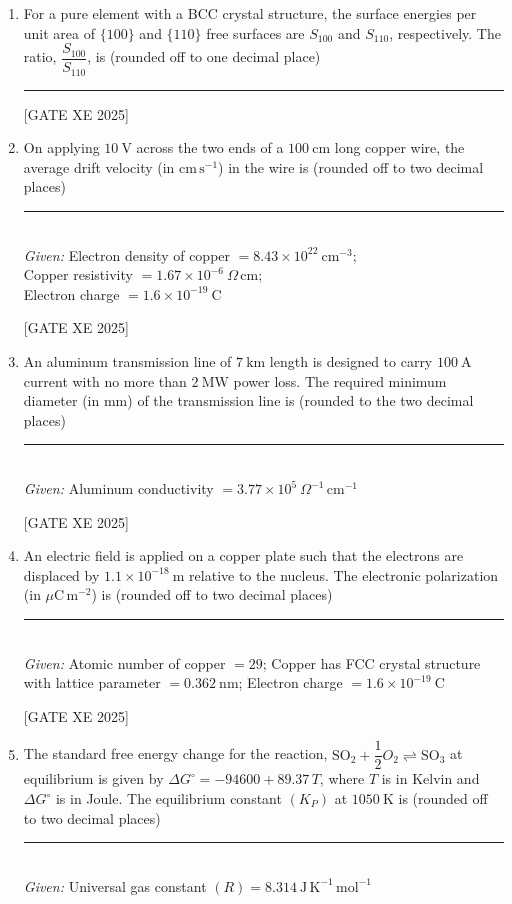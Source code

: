 \documentclass[journal,12pt,onecolumn]{IEEEtran}
\theoremstyle{remark}
\begin{document}
\begin{enumerate}
\item For a pure element with a BCC crystal structure, the surface energies per unit area of $\{100\}$ and $\{110\}$ free surfaces are $S_{100}$ and $S_{110}$, respectively. The ratio, $\dfrac{S_{100}}{S_{110}}$, is (rounded off to one decimal place) \rule{3cm}{0.15mm}

\hfill[GATE XE 2025]

\item On applying $10~\mathrm{V}$ across the two ends of a $100~\mathrm{cm}$ long copper wire, the average drift velocity (in $\mathrm{cm\, s^{-1}}$) in the wire is (rounded off to two decimal places) \rule{3cm}{0.15mm} \\
\textit{Given:} Electron density of copper $= 8.43 \times 10^{22}~\mathrm{cm^{-3}}$; \\
Copper resistivity $= 1.67 \times 10^{-6}~\Omega\,\mathrm{cm}$; \\
Electron charge $= 1.6 \times 10^{-19}~\mathrm{C}$

\hfill[GATE XE 2025]

\item An aluminum transmission line of $7~\mathrm{km}$ length is designed to carry $100~\mathrm{A}$ current with no more than $2~\mathrm{MW}$ power loss. The required minimum diameter (in mm) of the transmission line is (rounded to the two decimal places) \rule{3cm}{0.15mm} \\
\textit{Given:} Aluminum conductivity $= 3.77 \times 10^{5}~\Omega^{-1}\,\mathrm{cm^{-1}}$

\hfill[GATE XE 2025]

\item An electric field is applied on a copper plate such that the electrons are displaced by $1.1 \times 10^{-18}~\mathrm{m}$ relative to the nucleus. The electronic polarization (in $\mu\mathrm{C\, m^{-2}}$) is (rounded off to two decimal places) \rule{3cm}{0.15mm} \\
\textit{Given:} Atomic number of copper $=29$; Copper has FCC crystal structure with lattice parameter $= 0.362~\mathrm{nm}$; Electron charge $= 1.6 \times 10^{-19}~\mathrm{C}$

\hfill[GATE XE 2025]

\item The standard free energy change for the reaction, $\mathrm{SO_2} + \dfrac{1}{2}{O_2} \rightleftharpoons \mathrm{SO_3}$ at equilibrium is given by $\Delta G^\circ = -94600 + 89.37\,T$, where $T$ is in Kelvin and $\Delta G^\circ$ is in Joule. The equilibrium constant $(K_P)$ at $1050~\mathrm{K}$ is (rounded off to two decimal places) \rule{3cm}{0.15mm} \\
\textit{Given:} Universal gas constant $(R) = 8.314~\mathrm{J\, K^{-1}\, mol^{-1}}$


\end{enumerate}
\end{document}
